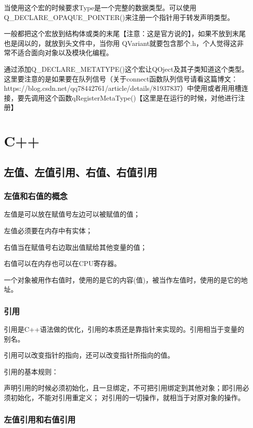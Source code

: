 当使用这个宏的时候要求Type是一个完整的数据类型。可以使用Q\_DECLARE\_OPAQUE\_POINTER()来注册一个指针用于转发声明类型。

一般都把这个宏放到结构体或类的末尾【注意：这是官方说的】，如果不放到末尾也是阔以的，就放到头文件中，当你用 QVariant就要包含那个.h，个人觉得这非常不适合面向对象以及模块化编程。

通过添加Q\_DECLARE\_METATYPE()这个宏让QOject及其子类知道这个类型。这里要注意的是如果要在队列信号（关于connect函数队列信号请看这篇博文：https://blog.csdn.net/qq78442761/article/details/81937837）中使用或者用用槽连接，要先调用这个函数qRegisterMetaType()【这里是在运行的时候，对他进行注册】

\section{C++}
\subsection{左值、左值引用、右值、右值引用}
\subsubsection{左值和右值的概念}

左值是可以放在赋值号左边可以被赋值的值；

左值必须要在内存中有实体；

右值当在赋值号右边取出值赋给其他变量的值；

右值可以在内存也可以在CPU寄存器。

一个对象被用作右值时，使用的是它的内容(值)，被当作左值时，使用的是它的地址。

\subsubsection{引用}

引用是C++语法做的优化，引用的本质还是靠指针来实现的。引用相当于变量的别名。

引用可以改变指针的指向，还可以改变指针所指向的值。

引用的基本规则：

声明引用的时候必须初始化，且一旦绑定，不可把引用绑定到其他对象；即引用必须初始化，不能对引用重定义；
对引用的一切操作，就相当于对原对象的操作。

\subsubsection{左值引用和右值引用}

